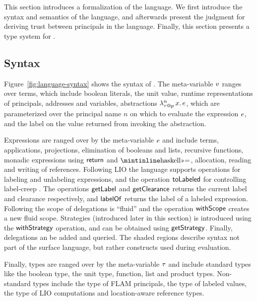This section introduces a formalization of the \lang{} language. We first introduce the syntax and semantics of the language, and afterwards present the judgment for deriving trust between principals in the language. Finally, this section presents a type system for \lang.

\subsection{Syntax}

Figure~\ref{fig:language-syntax} shows the syntax of \lang. The meta-variable $v$ ranges over terms, which include boolean literals, the unit value, runtime representations of principals, addresses and variables, abstractions $\lambda^{n}_{\tau \mathbin{@} p}\,x.\,e$, which are parameterized over the principal name $n$ on which to evaluate the expression $e$, and the label on the value returned from invoking the abstraction.

Expressions are ranged over by the meta-variable $e$ and include terms, applications, projections, elimination of booleans and lists, recursive functions, monadic expressions using $\mathsf{return}$ and $\bindop$, allocation, reading and writing of references. Following LIO \cite{SRMMlio} the language supports operations for labeling and unlabeling expressions, and the operation $\mathsf{toLabeled}$ for controlling label-creep \cite{SRMMlio}. The operations $\mathsf{getLabel}$ and $\mathsf{getClearance}$ returns the current label and clearance respectively, and $\mathsf{labelOf}$ returns the label of a labeled expression. Following \cite{Moore:2016:EAC:2983990.2984021} the scope of delegations is ``fluid'' and the operation $\mathsf{withScope}$ creates a new fluid scope. Strategies (introduced later in this section) is introduced using the $\mathsf{withStrategy}$ operation, and can be obtained using $\mathsf{getStrategy}$. Finally, delegations an be added and queried. The shaded regions describe syntax not part of the surface language, but rather constructs used during evaluation.

Finally, types are ranged over by the meta-variable $\tau$ and include standard types like the boolean type, the unit type, function, list and product types. Non-standard types include the type of FLAM principals, the type of labeled values, the type of LIO computations and location-aware reference types.

